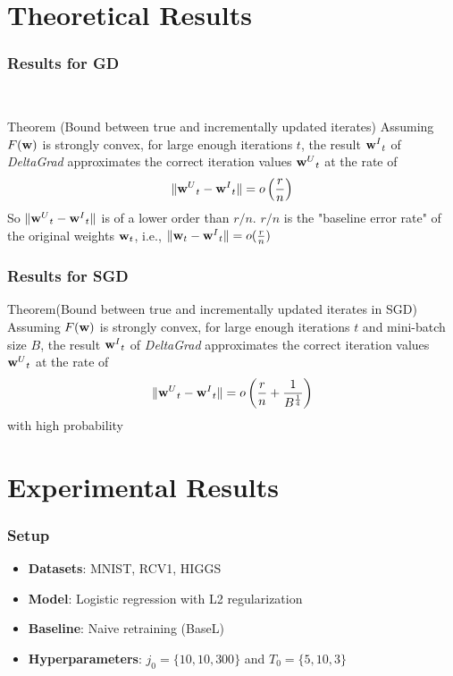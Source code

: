 \documentclass[pdf]{beamer}
\begin{document}
\section{Theoretical Results}

\begin{frame}
  \frametitle{Results for GD}\
  \label{theoretical}
  \begin{block}{Theorem (Bound between true and incrementally updated iterates)}
    Assuming $F(\textbf{w})$ is strongly convex, for large enough iterations $t$, the result ${\textbf{w}^{I}}_{t}$ of \textit{DeltaGrad} approximates the correct iteration values ${\textbf{w}^{U}}_{t}$ at the rate of 
    $$
    \|{\textbf{w}^{U}}_{t}-{\textbf{w}^{I}}_{t}\| = o\left( \frac{r}{n} \right)
    $$
  So $\|{\textbf{w}^{U}}_{t}-{\textbf{w}^{I}}_{t}\|$ is of a lower order than $r/n$.
  $r/n$ is the "baseline error rate" of the original weights $\textbf{w}_{t}$, i.e., $\|\textbf{w}_{t}-{\textbf{w}^{I}}_{t}\| = o(\frac{r}{n})$ 
  \end{block}
  \hyperlink{architecture}{}
\end{frame}

\begin{frame}
  \frametitle{Results for SGD}
  \begin{block}{Theorem(Bound between true and incrementally updated iterates in SGD)}
  Assuming $F(\textbf{w})$ is strongly convex, for large enough iterations $t$ and mini-batch size $B$, the result ${\textbf{w}^{I}}_{t}$ of \textit{DeltaGrad} approximates the correct iteration values ${\textbf{w}^{U}}_{t}$ at the rate of
  $$
  \|{\textbf{w}^{U}}_{t}-{\textbf{w}^{I}}_{t}\| = o\left( \frac{r}{n} +\frac{1}{B^{\frac{1}{4}}}\right)
  $$
  with high probability
  \end{block}
  

\end{frame}
\section{Experimental Results}
\begin{frame}
  \frametitle{Setup}
  \begin{itemize}
    \item {\bf Datasets}: MNIST, RCV1, HIGGS
    \item {\bf Model}: Logistic regression with L2 regularization
    \item {\bf Baseline}: Naive retraining (BaseL)
    \item {\bf Hyperparameters}: $j_0 = \{10,10,300\}$ and $T_0 = \{5,10,3\}$
  \end{itemize}
\end{frame}
\end{document}
